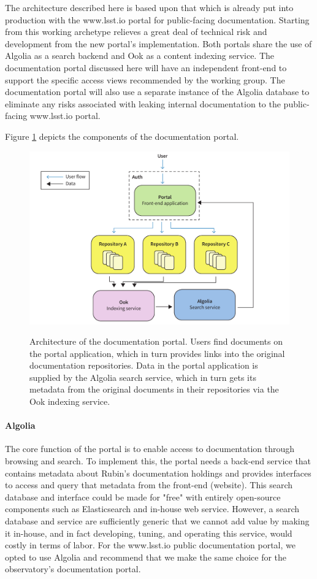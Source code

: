 The architecture described here is based upon that which is already put into production with the www.lsst.io portal for public-facing documentation. Starting from this working archetype relieves a great deal of technical risk and development from the new portal's implementation. Both portals share the use of Algolia as a search backend and Ook as a content indexing service. The documentation portal discussed here will have an independent front-end to support the specific access views recommended by the working group. The documentation portal will also use a separate instance of the Algolia database to eliminate any risks associated with leaking internal documentation to the public-facing www.lsst.io portal.

Figure \ref{fig:portal-arch} depicts the components of the documentation portal.

\begin{figure}[t]
\caption{Architecture of the documentation portal. Users find documents on the portal application, which in turn provides links into the original documentation repositories. Data in the portal application is supplied by the Algolia search service, which in turn gets its metadata from the original documents in their repositories via the Ook indexing service.}
\centering
\includegraphics[width=\textwidth]{portal-architecture}
\label{fig:portal-arch}
\end{figure}

\paragraph{Algolia}

The core function of the portal is to enable access to documentation through browsing and search. To implement this, the portal needs a back-end service that contains metadata about Rubin's documentation holdings and provides interfaces to access and query that metadata from the front-end (website). This search database and interface could be made for "free" with entirely open-source components such as Elasticsearch and in-house web service. However, a search database and service are sufficiently generic that we cannot add value by making it in-house, and in fact developing, tuning, and operating this service, would costly in terms of labor. For the www.lsst.io public documentation portal, we opted to use Algolia and recommend that we make the same choice for the observatory's documentation portal.

